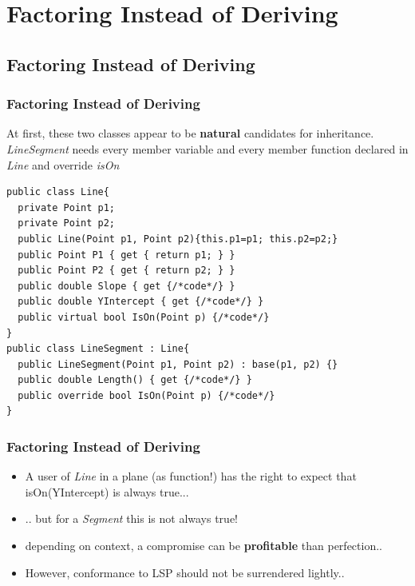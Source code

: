 \documentclass{beamer}
\begin{document}
\section{Factoring Instead of Deriving}
\subsection{Factoring Instead of Deriving}
\begin{frame}[containsverbatim]
	\frametitle{Factoring Instead of Deriving}
	At first, these two classes appear to be \textbf{natural} candidates for inheritance. \textit{LineSegment} needs every member variable and every member function declared in \textit{Line} and override \textit{isOn}\\
	\begin{lstlisting}
public class Line{
  private Point p1;
  private Point p2;
  public Line(Point p1, Point p2){this.p1=p1; this.p2=p2;}
  public Point P1 { get { return p1; } }
  public Point P2 { get { return p2; } }
  public double Slope { get {/*code*/} }
  public double YIntercept { get {/*code*/} }
  public virtual bool IsOn(Point p) {/*code*/}
}
public class LineSegment : Line{
  public LineSegment(Point p1, Point p2) : base(p1, p2) {}
  public double Length() { get {/*code*/} }
  public override bool IsOn(Point p) {/*code*/}
}
	\end{lstlisting}
\end{frame}

\begin{frame}
  \frametitle{Factoring Instead of Deriving}
	\begin{itemize}
	\item<+-> A user of \textit{Line} in a plane (as function!) has the right to expect that isOn(YIntercept) is always true...
	\item<+-> .. but for a \textit{Segment} this is not always true!
	\item<+-> depending on context, a compromise can be \textbf{profitable} than perfection.. 
	\item<+-> However, conformance to LSP should not be surrendered lightly..
   \end{itemize}
\end{frame}
\end{document}
